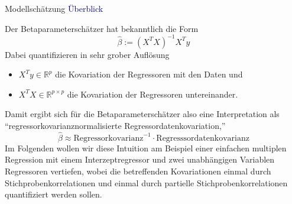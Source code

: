 \documentclass[
  8pt,
  ignorenonframetext,
]{beamer}
\providecommand{\tightlist}{%
  \setlength{\itemsep}{0pt}\setlength{\parskip}{0pt}}
\begin{document}
\begin{frame}{Modellschätzung}
\protect\hypertarget{modellschuxe4tzung-2}{}
\textcolor{darkblue}{Überblick}

\small

Der Betaparameterschätzer hat bekanntlich die Form \begin{equation}
\hat{\beta} := (X^TX)^{-1}X^Ty
\end{equation} Dabei quantifizieren in sehr grober Auflösung

\begin{itemize}
\tightlist
\item
  \(X^Ty \in \mathbb{R}^p\) die Kovariation der Regressoren mit den
  Daten und
\item
  \(X^TX \in \mathbb{R}^{p \times p}\) die Kovariation der Regressoren
  untereinander.
\end{itemize}

Damit ergibt sich für die Betaparameterschätzer also eine Interpretation
als ``regressorkovarianznormalisierte Regressordatenkovariation,''
\begin{equation}
\hat{\beta} \approx \mbox{Regressorkovarianz}^{-1} \cdot \mbox{Regresssordatenkovarianz}
\end{equation} Im Folgenden wollen wir diese Intuition am Beispiel einer
einfachen multiplen Regression mit einem Interzeptregressor und zwei
unabhängigen Variablen Regressoren vertiefen, wobei die betreffenden
Kovariationen einmal durch Stichprobenkorrelationen und einmal durch
partielle Stichprobenkorrelationen quantifiziert werden sollen.
\end{frame}
\end{document}
